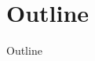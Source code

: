 



\maketitle

\section{Outline}
\begin{frame}{Outline}
\begin{scriptsize}
    \tableofcontents
\end{scriptsize}
\end{frame}

